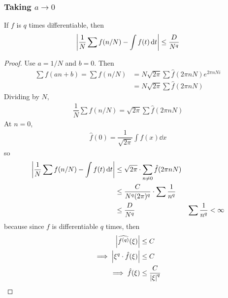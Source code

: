 \subsubsection{Taking $a \to 0$}
\begin{lemma}
    If $f$ is $q$ times differentiable, then
    \begin{align}
        \abs{\dfrac{1}{N}\sum f(n/N) - \int f(t) \dd{t}} \le \dfrac{D}{N^q}
    \end{align}
\end{lemma}
\begin{proof}
    Use $a = 1/N$ and $b = 0$. Then
    \begin{align}
        \sum f(an+b) = \sum f(n/N) &= N\sqrt{2\pi} \sum \hat{f}(2\pi n N) e^{2\pi nNi}\\
        &= N\sqrt{2\pi} \sum \hat{f}(2\pi n N)
    \end{align}
    Dividing by $N$,
    \begin{align}
        \dfrac{1}{N} \sum f(n/N) = \sqrt{2\pi} \sum \hat{f}(2\pi n N)
    \end{align}
    At $n=0$,
    \begin{align}
        \hat{f}(0) = \dfrac{1}{\sqrt{2\pi}} \int f(x) \dd{x}
    \end{align}
    so
    \begin{align}
        \abs{\dfrac{1}{N}\sum f(n/N) - \int f(t) \dd{t}} &\le \sqrt{2\pi} \cdot \sum_{n \ne 0} \hat{f}(2\pi n N)\\
        &\le \dfrac{C}{N^q (2\pi)^q} \cdot \sum \dfrac{1}{n^q}\\
        &\le \dfrac{D}{N^q} & \sum \dfrac{1}{n^q} < \infty
    \end{align}
    because since $f$ is differentiable $q$ times, then
    \begin{align}
        \abs{\widehat{f^{(q)}}(\xi)} &\le C\\
        \implies \abs{\xi^{q} \cdot \hat{f}(\xi)} &\le C\\
        \implies \hat{f}(\xi) &\le \dfrac{C}{\abs{\xi}^{q}}
    \end{align}
\end{proof}